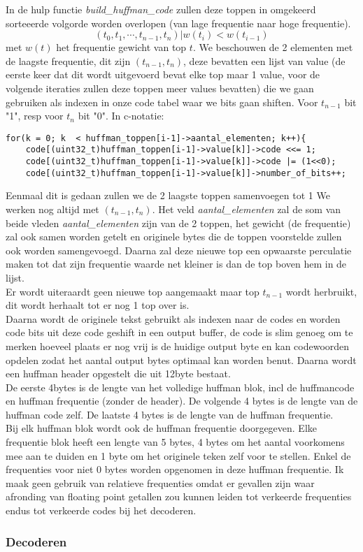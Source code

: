 \documentclass[10pt,a4paper]{report}
\begin{document}
In de hulp functie \emph{build\_huffman\_code} zullen deze toppen in omgekeerd sorteeerde volgorde worden overlopen (van lage frequentie naar hoge frequentie). 
$$(t_{0},t_{1},\cdots,t_{n-1},t_{n}) | w(t_{i}) < w(t_{i-1})$$
met $w(t)$ het frequentie gewicht van top $t$. We beschouwen de 2 elementen met de laagste frequentie, dit zijn $(t_{n-1},t_{n})$, deze bevatten een lijst van value (de eerste keer dat dit wordt uitgevoerd bevat elke top maar 1 value, voor de volgende iteraties zullen deze toppen meer values bevatten) die we gaan gebruiken als indexen in onze code tabel waar we bits gaan shiften. Voor $t_{n-1}$ bit "1", resp voor $t_{n}$ bit "0". In c-notatie:
\begin{lstlisting}
for(k = 0; k  < huffman_toppen[i-1]->aantal_elementen; k++){       
	code[(uint32_t)huffman_toppen[i-1]->value[k]]->code <<= 1; 
	code[(uint32_t)huffman_toppen[i-1]->value[k]]->code |= (1<<0);
	code[(uint32_t)huffman_toppen[i-1]->value[k]]->number_of_bits++;
\end{lstlisting}

Eenmaal dit is gedaan zullen we de 2 laagste toppen samenvoegen tot 1
We werken nog altijd met $(t_{n-1},t_{n})$. Het veld \emph{aantal\_elementen} zal de som van beide vleden \emph{aantal\_elementen} zijn van de 2 toppen, het gewicht (de frequentie) zal ook samen worden getelt en originele bytes die de toppen voorstelde zullen ook worden samengevoegd. Daarna zal deze nieuwe top een opwaarste perculatie maken tot dat zijn frequentie waarde net kleiner is dan de top boven hem in de lijst.\\

Er wordt uiteraardt geen nieuwe top aangemaakt maar top $t_{n-1}$ wordt herbruikt, dit wordt herhaalt tot er nog 1 top over is. \\

Daarna wordt de originele tekst gebruikt als indexen naar de codes en worden code bits uit deze code geshift in een output buffer, de code is slim genoeg om te merken hoeveel plaats er nog vrij is de huidige output byte en kan codewoorden opdelen zodat het aantal output bytes optimaal kan worden benut.
Daarna wordt een huffman header opgestelt die uit 12byte bestaat.\\
De eerste 4bytes is de lengte van het volledige huffman blok, incl de huffmancode en huffman frequentie  (zonder de header). 
De volgende 4 bytes is de lengte van de huffman code zelf. De laatste 4 bytes is de lengte van de huffman frequentie.\\

Bij elk huffman blok wordt ook de huffman frequentie doorgegeven. Elke frequentie blok heeft een lengte van 5 bytes, 4 bytes om het aantal voorkomens mee aan te duiden en 1 byte om het originele teken zelf voor te stellen. Enkel de frequenties voor niet 0 bytes worden opgenomen in deze huffman frequentie. Ik maak geen gebruik van relatieve frequenties omdat er gevallen zijn waar afronding van floating point getallen zou kunnen leiden tot verkeerde frequenties endus tot verkeerde codes bij het decoderen.\\
\subsubsection*{Decoderen}
\end{document}
